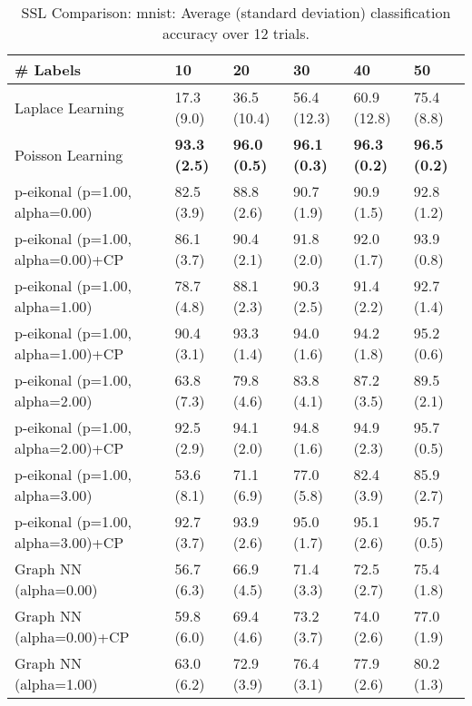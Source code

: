 \documentclass{article}
\begin{document}
\begin{table*}[t!]
\vspace{-3mm}
\caption{SSL Comparison: mnist: Average (standard deviation) classification accuracy over 12 trials.}
\vspace{-3mm}
\label{tab:SSL Comparison: mnist}
\vskip 0.15in
\begin{center}
\begin{small}
\begin{sc}
\begin{tabular}{llllll}
\toprule
\# Labels&\textbf{10}&\textbf{20}&\textbf{30}&\textbf{40}&\textbf{50}\\
\midrule
Laplace Learning&17.3 (9.0)      &36.5 (10.4)      &56.4 (12.3)      &60.9 (12.8)      &75.4 (8.8)      \\
Poisson Learning&{\bf 93.3 (2.5)}&{\bf 96.0 (0.5)}&{\bf 96.1 (0.3)}&{\bf 96.3 (0.2)}&{\bf 96.5 (0.2)}\\
p-eikonal (p=1.00, alpha=0.00)&82.5 (3.9)      &88.8 (2.6)      &90.7 (1.9)      &90.9 (1.5)      &92.8 (1.2)      \\
p-eikonal (p=1.00, alpha=0.00)+CP&86.1 (3.7)      &90.4 (2.1)      &91.8 (2.0)      &92.0 (1.7)      &93.9 (0.8)      \\
p-eikonal (p=1.00, alpha=1.00)&78.7 (4.8)      &88.1 (2.3)      &90.3 (2.5)      &91.4 (2.2)      &92.7 (1.4)      \\
p-eikonal (p=1.00, alpha=1.00)+CP&90.4 (3.1)      &93.3 (1.4)      &94.0 (1.6)      &94.2 (1.8)      &95.2 (0.6)      \\
p-eikonal (p=1.00, alpha=2.00)&63.8 (7.3)      &79.8 (4.6)      &83.8 (4.1)      &87.2 (3.5)      &89.5 (2.1)      \\
p-eikonal (p=1.00, alpha=2.00)+CP&92.5 (2.9)      &94.1 (2.0)      &94.8 (1.6)      &94.9 (2.3)      &95.7 (0.5)      \\
p-eikonal (p=1.00, alpha=3.00)&53.6 (8.1)      &71.1 (6.9)      &77.0 (5.8)      &82.4 (3.9)      &85.9 (2.7)      \\
p-eikonal (p=1.00, alpha=3.00)+CP&92.7 (3.7)      &93.9 (2.6)      &95.0 (1.7)      &95.1 (2.6)      &95.7 (0.5)      \\
Graph NN (alpha=0.00)&56.7 (6.3)      &66.9 (4.5)      &71.4 (3.3)      &72.5 (2.7)      &75.4 (1.8)      \\
Graph NN (alpha=0.00)+CP&59.8 (6.0)      &69.4 (4.6)      &73.2 (3.7)      &74.0 (2.6)      &77.0 (1.9)      \\
Graph NN (alpha=1.00)&63.0 (6.2)      &72.9 (3.9)      &76.4 (3.1)      &77.9 (2.6)      &80.2 (1.3)      \\

\end{tabular}
\end{sc}
\end{small}
\end{center}
\end{table*}
\end{document}
